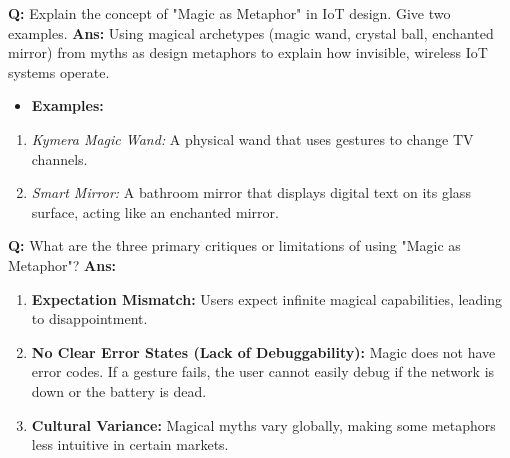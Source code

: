\documentclass[10pt,a4paper,twocolumn]{article}
\begin{document}
\begin{tcolorbox}[
  colback=white,
  colframe=UnitColorTwo,
  colbacktitle=gray!10!white,
  coltitle=black,
  fonttitle=\bfseries\sffamily\small,
  title={Unit II $\bullet$ Card 6},
  boxrule=1.2pt,
  arc=2mm,
  outer arc=2mm,
  boxsep=1.5mm,
  top=1mm,
  bottom=1mm,
  left=1.5mm,
  right=1.5mm,
  before skip=2.5mm,
  after skip=2.5mm
]
\textbf{Q:} Explain the concept of "Magic as Metaphor" in IoT design. Give two examples.
\tcbline
\textbf{Ans:} Using magical archetypes (magic wand, crystal ball, enchanted mirror) from myths as design metaphors to explain how invisible, wireless IoT systems operate.  
\begin{itemize}
  \item   \textbf{Examples:}
\end{itemize}
\begin{enumerate}
  \item \textit{Kymera Magic Wand:} A physical wand that uses gestures to change TV channels.
  \item \textit{Smart Mirror:} A bathroom mirror that displays digital text on its glass surface, acting like an enchanted mirror.
\end{enumerate}
\end{tcolorbox}


\begin{tcolorbox}[
  colback=white,
  colframe=UnitColorTwo,
  colbacktitle=gray!10!white,
  coltitle=black,
  fonttitle=\bfseries\sffamily\small,
  title={Unit II $\bullet$ Card 7},
  boxrule=1.2pt,
  arc=2mm,
  outer arc=2mm,
  boxsep=1.5mm,
  top=1mm,
  bottom=1mm,
  left=1.5mm,
  right=1.5mm,
  before skip=2.5mm,
  after skip=2.5mm
]
\textbf{Q:} What are the three primary critiques or limitations of using "Magic as Metaphor"?
\tcbline
\textbf{Ans:} \begin{enumerate}
  \item \textbf{Expectation Mismatch:} Users expect infinite magical capabilities, leading to disappointment.
  \item \textbf{No Clear Error States (Lack of Debuggability):} Magic does not have error codes. If a gesture fails, the user cannot easily debug if the network is down or the battery is dead.
  \item \textbf{Cultural Variance:} Magical myths vary globally, making some metaphors less intuitive in certain markets.
\end{enumerate}
\end{tcolorbox}
\end{document}
